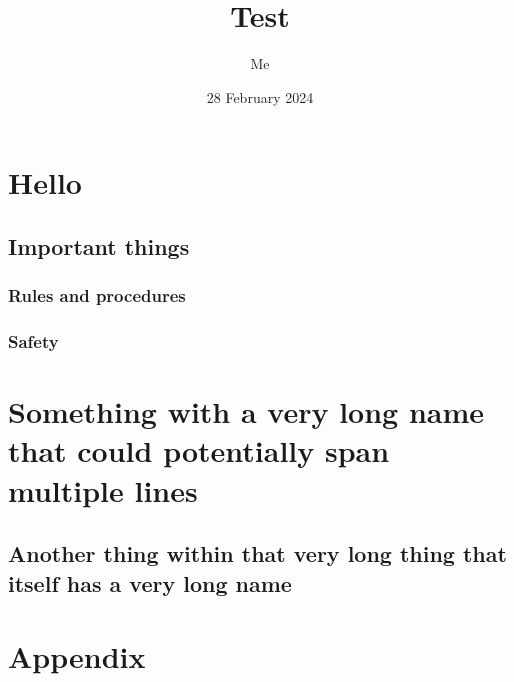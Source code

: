 \documentclass[10pt, a4paper]{ooga-booga}
\title{Test}
\author{Me}
\date{28 February 2024}
\begin{document}
\frontmatter

\maketitle

\tableofcontents

\mainmatter

\chapter{Hello}

\lipsum[1-2]

\section{Important things}

\subsection{Rules and procedures}

\lipsum[3-8]

\subsection{Safety}

\lipsum[9-12]

\chapter{Something with a very long name that could potentially span multiple lines}

\section{Another thing within that very long thing that itself has a very long name}

\lipsum[13-15]

\backmatter

\chapter{Appendix}

\lipsum[20-22]
\end{document}
